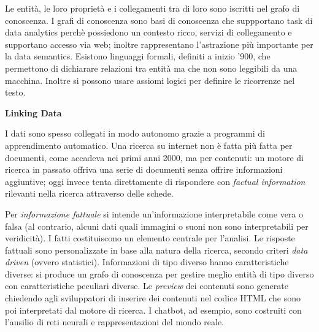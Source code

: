 \documentclass[11pt]{article}
\begin{document}
Le entità, le loro proprietà e i collegamenti tra di loro sono iscritti nel grafo di conoscenza. I grafi di conoscenza sono basi di conoscenza che suppportano task di data analytics perchè possiedono un contesto ricco, servizi di collegamento e supportano accesso via web; inoltre rappresentano l'astrazione più importante per la data semantics.
Esistono linguaggi formali, definiti a inizio '900, che permettono di dichiarare relazioni tra entità ma che non sono leggibili da una macchina.
Inoltre si possono usare assiomi logici per definire le ricorrenze nel testo.
\newline

\begin{itshape}
\textbf{Linking Data}
\end{itshape}

I dati sono spesso collegati in modo autonomo grazie a programmi di apprendimento automatico.
Una ricerca su internet non è fatta più fatta per documenti, come accadeva nei primi anni 2000, ma per contenuti: un motore di ricerca in passato offriva una serie di documenti senza offrire informazioni aggiuntive; oggi invece tenta direttamente di rispondere con \textit{factual information} rilevanti nella ricerca attraverso delle schede.

Per \textit{informazione fattuale} si intende un'informazione interpretabile come vera o falsa (al contrario, alcuni dati quali immagini o suoni non sono interpretabili per veridicità).
I fatti costituiscono un elemento centrale per l'analisi.
Le risposte fattuali sono personalizzate in base alla natura della ricerca, secondo criteri \textit{data driven} (ovvero statistici).
Informazioni di tipo diverso hanno caratteristiche diverse: si produce un grafo di conoscenza per gestire meglio entità di tipo diverso con caratteristiche peculiari diverse.
Le \textit{preview} dei contenuti sono generate chiedendo agli sviluppatori di inserire dei contenuti nel codice HTML che sono poi interpretati dal motore di ricerca. I chatbot, ad esempio, sono costruiti con l'ausilio di reti neurali e rappresentazioni del mondo reale.
\end{document}
